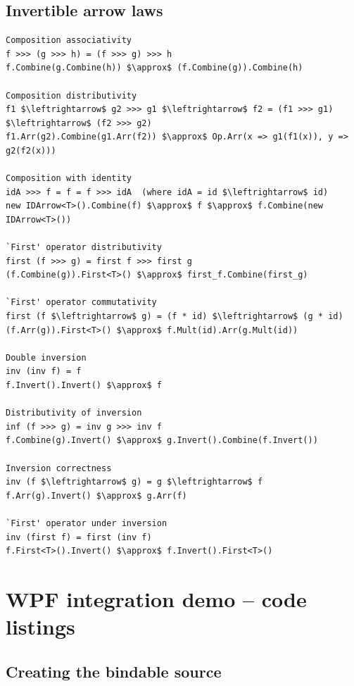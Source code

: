 \documentclass[12pt,twoside,notitlepage]{report}
\begin{document}
\section{Invertible arrow laws} \label{sec:invertible_arrow_laws}

\begin{samepage}
\begin{lstlisting}[mathescape]
Composition associativity
f >>> (g >>> h) = (f >>> g) >>> h
f.Combine(g.Combine(h)) $\approx$ (f.Combine(g)).Combine(h)

Composition distributivity
f1 $\leftrightarrow$ g2 >>> g1 $\leftrightarrow$ f2 = (f1 >>> g1) $\leftrightarrow$ (f2 >>> g2)
f1.Arr(g2).Combine(g1.Arr(f2)) $\approx$ Op.Arr(x => g1(f1(x)), y => g2(f2(x)))

Composition with identity
idA >>> f = f = f >>> idA  (where idA = id $\leftrightarrow$ id)
new IDArrow<T>().Combine(f) $\approx$ f $\approx$ f.Combine(new IDArrow<T>())

`First' operator distributivity
first (f >>> g) = first f >>> first g
(f.Combine(g)).First<T>() $\approx$ first_f.Combine(first_g)

`First' operator commutativity
first (f $\leftrightarrow$ g) = (f * id) $\leftrightarrow$ (g * id)
(f.Arr(g)).First<T>() $\approx$ f.Mult(id).Arr(g.Mult(id))

Double inversion
inv (inv f) = f
f.Invert().Invert() $\approx$ f

Distributivity of inversion
inf (f >>> g) = inv g >>> inv f
f.Combine(g).Invert() $\approx$ g.Invert().Combine(f.Invert())

Inversion correctness
inv (f $\leftrightarrow$ g) = g $\leftrightarrow$ f
f.Arr(g).Invert() $\approx$ g.Arr(f)

`First' operator under inversion
inv (first f) = first (inv f)
f.First<T>().Invert() $\approx$ f.Invert().First<T>()
\end{lstlisting}
\end{samepage}

\cleardoublepage



\chapter{WPF integration demo -- code listings}  \label{sec:wpf_integration_code}

\section{Creating the bindable source}
\end{document}
